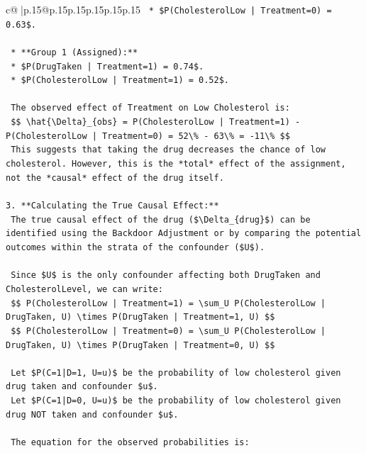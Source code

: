 \documentclass{article}
\begin{document}
{\begin{supertabular}{c@{$\;$}|p{.15\linewidth}@{}p{.15\linewidth}p{.15\linewidth}p{.15\linewidth}p{.15\linewidth}p{.15\linewidth}}
{{{\texttt{        *   \$P(CholesterolLow | Treatment=0) = 0.63\$.} \\
\\ 
\texttt{    *   **Group 1 (Assigned):**} \\
\texttt{        *   \$P(DrugTaken | Treatment=1) = 0.74\$.} \\
\texttt{        *   \$P(CholesterolLow | Treatment=1) = 0.52\$.} \\
\\ 
\texttt{    The observed effect of Treatment on Low Cholesterol is:} \\
\texttt{    \$\$ \textbackslash{}hat\{\textbackslash{}Delta\}\_\{obs\} = P(CholesterolLow | Treatment=1) {-} P(CholesterolLow | Treatment=0) = 52\textbackslash{}\% {-} 63\textbackslash{}\% = {-}11\textbackslash{}\% \$\$} \\
\texttt{    This suggests that taking the drug decreases the chance of low cholesterol. However, this is the *total* effect of the assignment, not the *causal* effect of the drug itself.} \\
\\ 
\texttt{3.  **Calculating the True Causal Effect:**} \\
\texttt{    The true causal effect of the drug (\$\textbackslash{}Delta\_\{drug\}\$) can be identified using the Backdoor Adjustment or by comparing the potential outcomes within the strata of the confounder (\$U\$).} \\
\\ 
\texttt{    Since \$U\$ is the only confounder affecting both DrugTaken and CholesterolLevel, we can write:} \\
\texttt{    \$\$ P(CholesterolLow | Treatment=1) = \textbackslash{}sum\_U P(CholesterolLow | DrugTaken, U) \textbackslash{}times P(DrugTaken | Treatment=1, U) \$\$} \\
\texttt{    \$\$ P(CholesterolLow | Treatment=0) = \textbackslash{}sum\_U P(CholesterolLow | DrugTaken, U) \textbackslash{}times P(DrugTaken | Treatment=0, U) \$\$} \\
\\ 
\texttt{    Let \$P(C=1|D=1, U=u)\$ be the probability of low cholesterol given drug taken and confounder \$u\$.} \\
\texttt{    Let \$P(C=1|D=0, U=u)\$ be the probability of low cholesterol given drug NOT taken and confounder \$u\$.} \\
\\ 
\texttt{    The equation for the observed probabilities is:} \\
}}}
\end{supertabular}}
\end{document}
